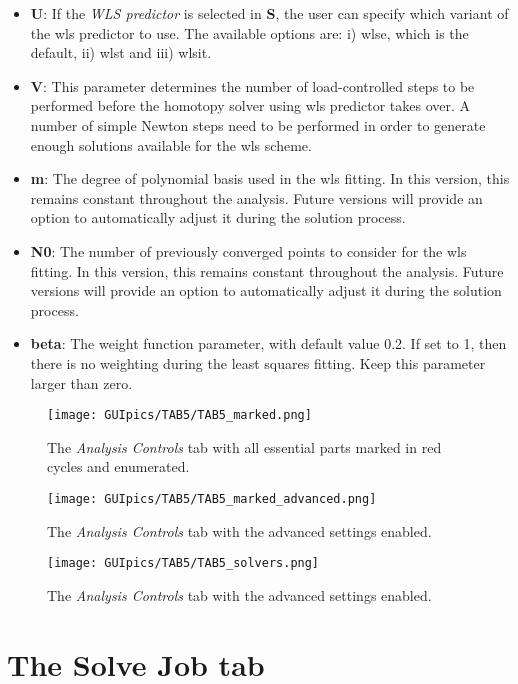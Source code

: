 \begin{itemize}
	\item \textbf{U}: If the \textit{WLS predictor} is selected in \textbf{S}, 
	the user can specify which variant of the \acrshort{wls} predictor to use. 
	The available options are: i) \acrshort{wlse}, which is the default, ii) 
	\acrshort{wlst} and iii) \acrshort{wlsit}.
	\item \textbf{V}: This parameter determines the number of load-controlled 
	steps to be performed before the homotopy solver using \acrshort{wls} 
	predictor takes over. A number of simple Newton steps need to be performed 
	in order to generate enough solutions available for the \acrshort{wls} 
	scheme.
	\item \textbf{m}: The degree of polynomial basis used in the \acrshort{wls} 
	fitting. In this version, this remains constant throughout the analysis. 
	Future versions will provide an option to automatically adjust it during 
	the solution process.
	\item \textbf{N0}: The number of previously converged points to consider 
	for the \acrshort{wls} fitting. In this version, this remains constant 
	throughout the analysis. Future versions will provide an option to 
	automatically adjust  it during the solution process.
	\item \textbf{beta}: The weight function parameter, with default value 0.2. 
	If set to 1, then there is no weighting during the least squares fitting. 
	Keep this parameter larger than zero.
\end{itemize}
\begin{figure}
	\centering
	\texttt{[image: GUIpics/TAB5/TAB5\_marked.png]}
	\caption{The \textit{Analysis Controls} tab with all essential parts 
		marked in red cycles and enumerated.}
	\label{fig:TAB5_marked}
\end{figure}

\begin{figure}
	\centering
	\texttt{[image: GUIpics/TAB5/TAB5\_marked\_advanced.png]}
	\caption{The \textit{Analysis Controls} tab with the advanced settings 
	enabled.}
	\label{fig:TAB5_marked_advanced}
\end{figure}

\begin{figure}
	\centering
	\texttt{[image: GUIpics/TAB5/TAB5\_solvers.png]}
	\caption{The \textit{Analysis Controls} tab with the advanced settings 
	enabled.}
	\label{fig:TAB5_solvers}
\end{figure}

\section{The Solve Job tab}

